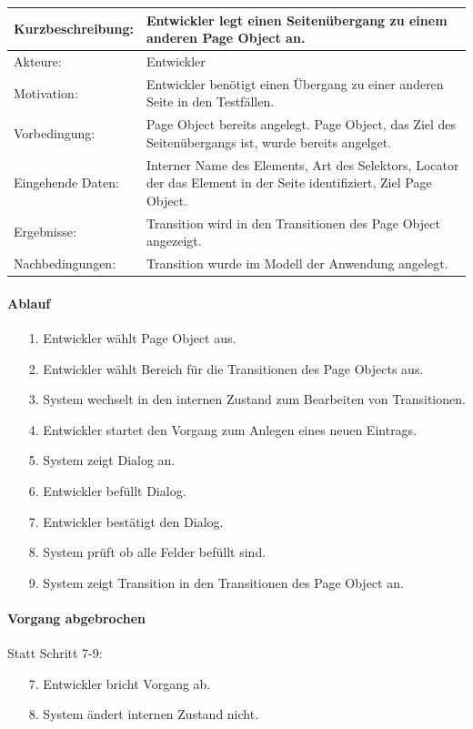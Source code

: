 \begin{tabular}[h]{|p{4cm}|p{}|}
\hline 
\rule[-1ex]{0pt}{2.5ex}Kurzbeschreibung: & 
Entwickler legt einen Seitenübergang zu einem anderen Page Object an. \\  
\hline 
\rule[-1ex]{0pt}{2.5ex}Akteure: & 
Entwickler \\ 
\hline 
\rule[-1ex]{0pt}{2.5ex}Motivation: & 
Entwickler benötigt einen Übergang zu einer anderen Seite in den Testfällen. \\ 
\hline 
\rule[-1ex]{0pt}{2.5ex}Vorbedingung: & 
Page Object bereits angelegt. Page Object, das Ziel des Seitenübergangs ist, wurde bereits angelget.\\ 
\hline 
\rule[-1ex]{0pt}{2.5ex}Eingehende Daten: & Interner Name des Elements, Art des Selektors, Locator der das Element in der Seite identifiziert, Ziel Page Object. \\ 
\hline 
\rule[-1ex]{0pt}{2.5ex}Ergebnisse: & Transition wird in den Transitionen des Page Object angezeigt. \\ 
\hline 
\rule[-1ex]{0pt}{2.5ex}Nachbedingungen: & Transition wurde im Modell der Anwendung angelegt.  \\ 
\hline 
\end{tabular} 

\paragraph{Ablauf}

\begin{itemize}[itemsep=0pt]
\item[1.] Entwickler wählt Page Object aus.
\item[2.] Entwickler wählt Bereich für die Transitionen des Page Objects aus. 
\item[3.] System wechselt in den internen Zustand zum Bearbeiten von Transitionen.
\item[4.] Entwickler startet den Vorgang zum Anlegen eines neuen Eintrags.
\item[5.] System zeigt Dialog an. 
\item[6.] Entwickler befüllt Dialog.
\item[7.] Entwickler bestätigt den Dialog.
\item[8.] System prüft ob alle Felder befüllt sind.
\item[9.] System zeigt Transition in den Transitionen des Page Object an.
\end{itemize}

\paragraph{Vorgang abgebrochen}
Statt Schritt 7-9:
\begin{itemize}[itemsep=0pt]
\item[7.] Entwickler bricht Vorgang ab. 
\item[8.] System ändert internen Zustand nicht. 
\end{itemize}

